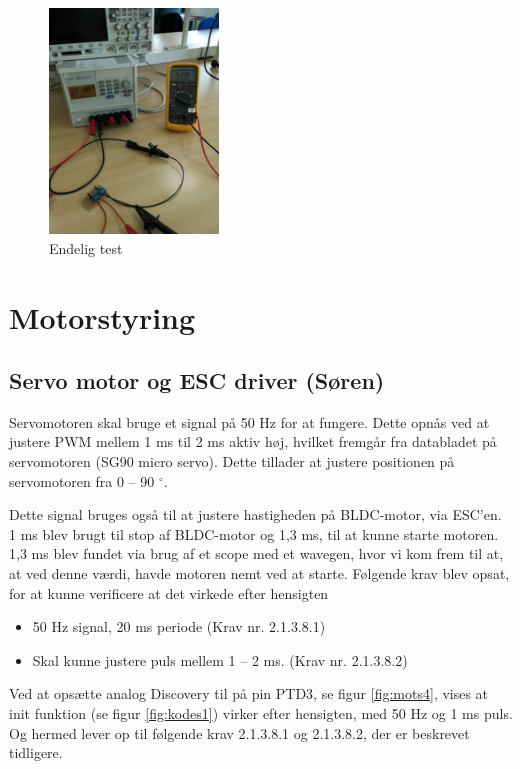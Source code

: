 \begin{figure}[h]
  \centering
  \includegraphics[width=0.4\textwidth]{./figurer/j12.png}
  \caption{Endelig test}
  \label{fig:j12}
\end{figure}

\clearpage
\section{Motorstyring}
\label{sec:motorstyring-1}

\subsection{Servo motor og ESC driver (Søren)}
\label{sec:servo-motor-og}

Servomotoren skal bruge et signal på 50 Hz for at fungere. Dette opnås ved at justere PWM mellem 1 ms til 2 ms aktiv høj, hvilket fremgår fra databladet på servomotoren (SG90 micro servo). Dette tillader at justere positionen på servomotoren fra 0 – 90 $^\circ$.

Dette signal bruges også til at justere hastigheden på BLDC-motor, via ESC'en. 1 ms blev brugt til stop af BLDC-motor og 1,3 ms, til at kunne starte motoren. 1,3 ms blev fundet via brug af et scope med et wavegen, hvor vi kom frem til at, at ved denne værdi, havde motoren nemt ved at starte. Følgende krav blev opsat, for at kunne verificere at det virkede efter hensigten

\begin{itemize}
\item 50 Hz signal, 20 ms periode (Krav nr. 2.1.3.8.1)
\item Skal kunne justere puls mellem 1 – 2 ms. (Krav nr. 2.1.3.8.2)
\end{itemize}

Ved at opsætte analog Discovery til på pin PTD3, se figur \ref{fig:mots4}, vises at init funktion (se figur \ref{fig:kodes1}) virker efter hensigten, med 50 Hz og 1 ms puls. Og hermed lever op til følgende krav 2.1.3.8.1 og 2.1.3.8.2, der er beskrevet tidligere.

